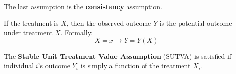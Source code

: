 The last assumption is the \textbf{consistency} assumption.
\begin{definition}[Consistency]
    If the treatment is $X$, then the observed outcome $Y$ is the potential outcome
    under treatment $X$. Formally:
    \begin{equation}
        X = x \rightarrow Y = Y(X)
    \end{equation}
\end{definition}

\begin{definition}
    The \textbf{Stable Unit Treatment Value Assumption} (SUTVA) is satisfied if
    individual $i$'s outcome $Y_i$ is simply a function of the treatment $X_i$.
\end{definition}